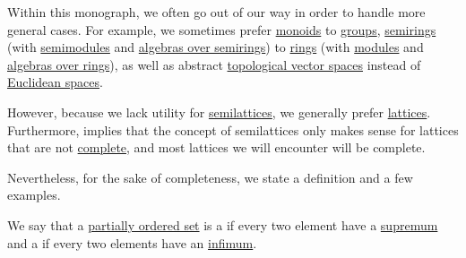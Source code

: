 \begin{remark}\label{rem:semilattices}
  Within this monograph, we often go out of our way in order to handle more general cases. For example, we sometimes prefer \hyperref[def:monoid]{monoids} to \hyperref[def:group]{groups}, \hyperref[def:semiring]{semirings} (with \hyperref[def:semimodule]{semimodules} and \hyperref[def:algebra_over_semiring]{algebras over semirings}) to \hyperref[def:ring]{rings} (with \hyperref[def:module]{modules} and \hyperref[def:algebra_over_ring]{algebras over rings}), as well as abstract \hyperref[def:topological_vector_space]{topological vector spaces} instead of \hyperref[def:euclidean_space]{Euclidean spaces}.

  However, because we lack utility for \hyperref[def:semilattice]{semilattices}, we generally prefer \hyperref[def:lattice]{lattices}. Furthermore,  implies that the concept of semilattices only makes sense for lattices that are not \hyperref[def:complete_lattice]{complete}, and most lattices we will encounter will be complete.

  Nevertheless, for the sake of completeness, we state a definition and a few examples.
\end{remark}

\begin{definition}\label{def:semilattice}
  We say that a \hyperref[def:partially_ordered_set]{partially ordered set} is a  if every two element have a \hyperref[def:extremal_points/supremum_and_infimum]{supremum} and a  if every two elements have an \hyperref[def:extremal_points/supremum_and_infimum]{infimum}.
\end{definition}

